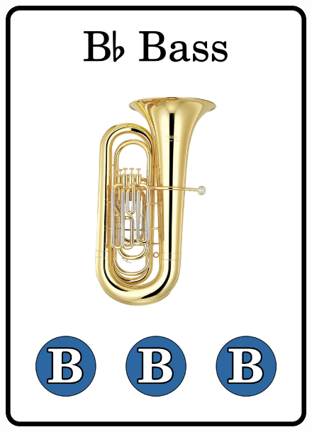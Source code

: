\documentclass[a6paper, 12pt, parskip=half, DIV=14]{scrartcl}
\begin{document}
\begin{figure}[h]
\includegraphics[scale=0.035]{Images/CardImages/bass_display_front.png}
\ 

\end{figure}
\end{document}
